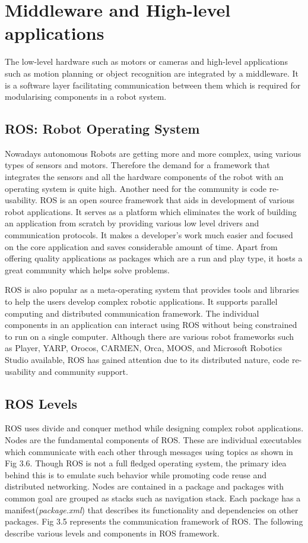 \section{Middleware and High-level applications}
The low-level hardware such as motors or cameras and high-level applications such as motion planning or object recognition are integrated by a middleware. It is a software layer facilitating communication between them which is required for modularising components in a robot system.   

\subsection{ROS: Robot Operating System}
Nowadays autonomous Robots are getting more and more complex, using various types of sensors and motors\cite{20}. Therefore the demand for a framework that integrates the sensors and all the hardware components of the robot with an operating system is quite high. Another need for the community is code re-usability. ROS is an open source framework\cite{13} that aids in development of various robot applications. It serves as a platform which eliminates the work of building an application from scratch by providing various low level drivers and communication protocols. It makes a developer's work much easier and focused on the core application and saves considerable amount of time. Apart from offering quality applications as packages which are a run and play type, it hosts a great community which helps solve problems.
\par ROS is also popular as a meta-operating system that provides tools and libraries to help the users develop complex robotic applications. It supports parallel computing and distributed communication framework. The individual components in an application can interact using ROS without being constrained to run on a single computer. Although there are various robot frameworks such as Player, YARP, Orocos, CARMEN, Orca, MOOS, and Microsoft Robotics Studio available, ROS has gained attention due to its distributed nature, code re-usability and community support.

\subsection{ROS Levels}
ROS uses divide and conquer method while designing complex robot applications\cite{34}. Nodes are the fundamental components of ROS. These are individual executables which communicate with each other through messages using topics as shown in Fig 3.6. Though ROS is not a full fledged operating system, the primary idea behind this is to emulate such behavior while promoting code reuse and distributed networking. Nodes are contained in a package and packages with common goal are grouped as stacks such as navigation stack. Each package has a manifest(\textit{package.xml}) that describes its functionality and dependencies on other packages. Fig 3.5 represents the communication framework of ROS\cite{33}.
The following describe various levels and components in ROS framework.

